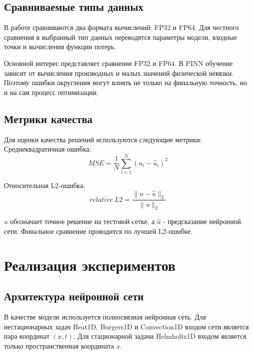 \documentclass[14pt,a4paper]{extarticle}
\begin{document}
\subsection{Сравниваемые типы данных}

В работе сравниваются два формата вычислений: FP32 и FP64. Для честного сравнения в выбранный тип данных переводятся параметры модели, входные точки и вычисления функции потерь. 

Основной интерес представляет сравнение FP32 и FP64. В PINN обучение зависит от вычисления производных и малых значений физической невязки. Поэтому ошибки округления могут влиять не только на финальную точность, но и на сам процесс оптимизации.


\subsection{Метрики качества}

Для оценки качества решений используются следующие метрики:
Среднеквадратичная ошибка:
\begin{equation}
    MSE =
        \frac{1}{N}
        \sum_{i=1}^{N}
        (u_i - \hat{u}_i)^2
    \label{eq:rmse}
\end{equation}

Относительная L2-ошибка:
\begin{equation}
    relative\ L2 =
    \frac{
        \|u - \hat{u}\|_2
    }{
        \|u\|_2
    }
    \label{eq:relative_l2}
\end{equation}

$u$ обозначает точное решение на тестовой сетке, а $\hat{u}$ - предсказание нейронной сети. Финальное сравнение проводится по лучшей L2-ошибке.




\section{Реализация экспериментов}

\subsection{Архитектура нейронной сети}

В качестве модели используется полносвязная нейронная сеть. Для нестационарных задач Heat1D, Burgers1D и Convection1D входом сети является пара координат $(x,t)$. Для стационарной задачи Helmholtz1D входом является только пространственная координата $x$.
\end{document}
